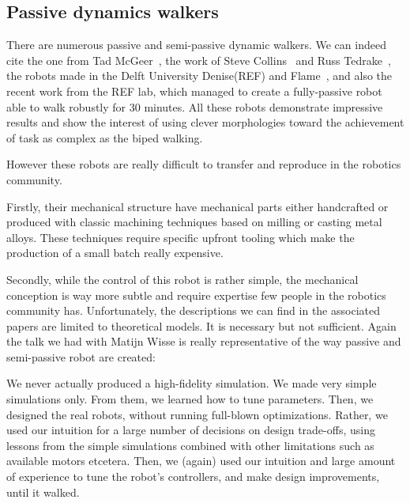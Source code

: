 

\subsection{Passive dynamics walkers} %

There are numerous passive and semi-passive dynamic walkers. We can indeed cite the one from Tad McGeer~\parencite{mcgeer1990passive}, the work of Steve Collins~\parencite{collins2001three} and Russ Tedrake~\parencite{tedrake2005learning}, the robots made in the Delft University Denise(REF) and Flame~\parencite{Hobbelen2008}, and also the recent work from the REF lab, which managed to create a fully-passive robot able to walk robustly for 30 minutes. All these robots demonstrate impressive results and show the interest of using clever morphologies toward the achievement of task as complex as the biped walking.

However these robots are really difficult to transfer and reproduce in the robotics community.

Firstly, their mechanical structure have mechanical parts either handcrafted or produced with classic machining techniques based on milling or casting metal alloys. These techniques require specific upfront tooling which make the production of a small batch really expensive.

Secondly, while the control of this robot is rather simple, the mechanical conception is way more subtle and require expertise few people in the robotics community has. Unfortunately, the descriptions we can find in the associated papers are limited to theoretical models. It is necessary but not sufficient. Again the talk we had with Matijn Wisse is really representative of the way passive and semi-passive robot are created:

\begin{formal}
We never actually produced a high-fidelity simulation. We made very simple simulations only. From them, we learned how to tune parameters. Then, we designed the real robots, without running full-blown optimizations. Rather, we used our intuition for a large number of decisions on design trade-offs, using lessons from the simple simulations combined with other limitations such as available motors etcetera. Then, we (again) used our intuition and large amount of experience to tune the robot’s controllers, and make design improvements, until it walked.

\end{formal}

